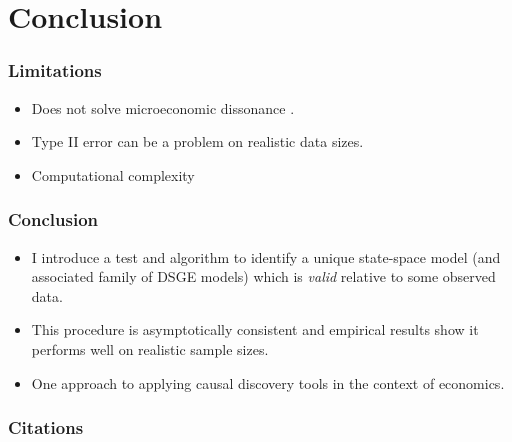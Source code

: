 \documentclass{beamer}
\begin{document}
\section{Conclusion}

\begin{frame}
    \frametitle{Limitations}
    \begin{itemize}
        \item Does not solve microeconomic dissonance \parencite{levin2008macroeconometric}.
        \item Type II error can be a problem on realistic data sizes.
        \item Computational complexity
    \end{itemize}
\end{frame}

\begin{frame}
    \frametitle{Conclusion}
    \begin{itemize}
        \item I introduce a test and algorithm to identify a unique state-space model (and associated family of DSGE models) which is \textit{valid} relative to some observed data.
        \item This procedure is asymptotically consistent and empirical results show it performs well on realistic sample sizes.
        \item One approach to applying causal discovery tools in the context of economics.
    \end{itemize}
\end{frame}

\begin{frame}
    \frametitle{Citations}
    \printbibliography
\end{frame}
\end{document}
